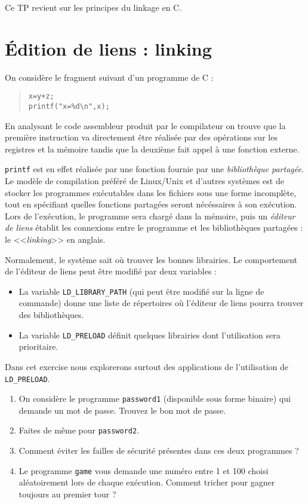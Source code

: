 \documentclass[11pt]{article}
\newcommand{\numtd}{07}
\newcommand{\titretd}{Petit hack entre amis}
\begin{document}
\entete{\numtd}{\titretd}

\begin{introduction}
Ce TP revient sur les principes du linkage en C.
\end{introduction}

\section*{Édition de liens : linking}

On considère le fragment suivant d'un programme de C :
\begin{quote}
\texttt{x=y+z;}\\
\verb+printf("x=%d\n",x);+
\end{quote}

En analysant le code assembleur produit par le compilateur on trouve
que la première instruction va directement être réalisée par
des opérations sur les registres et la mémoire tandis que la deuxième
fait appel à une fonction externe.

\texttt{printf} est en effet réalisée par une fonction fournie par une
\emph{bibliothèque partagée}. Le modèle de compilation préféré
de Linux/Unix et d'autres systèmes est de stocker les programmes exécutables
dans les fichiers sous une forme incomplète, tout en spécifiant quelles
fonctions partagées seront nécéssaires à son exécution. Lors de
l'exécution, le programme sera chargé dans la mémoire, puis un
\emph{éditeur de liens} établit les connexions entre le programme
et les bibliothèques partagées : le <<\emph{linking}>> en anglais.

Normalement, le système sait où trouver les bonnes librairies.
Le comportement de l'éditeur de liens peut être modifié par deux
variables :
\begin{itemize}
\item La variable \texttt{LD\_LIBRARY\_PATH} (qui peut être modifié
  sur la ligne de commande) donne une liste de répertoires où l'éditeur
  de liens pourra trouver des bibliothèques.
\item La variable \texttt{LD\_PRELOAD} définit quelques librairies dont
  l'utilisation sera prioritaire.
\end{itemize}

Dans cet exercise nous explorerons surtout des applications de l'utilisation de
\texttt{LD\_PRELOAD}.

\begin{enumerate}
\item On considère le programme \texttt{password1} (disponible sous forme
  binaire) qui demande un mot de passe. Trouvez le bon mot de passe.
\item Faites de même pour \texttt{password2}.
\item Comment éviter les failles de sécurité présentes dans ces
  deux programmes ?
\item Le programme \texttt{game} vous demande une numéro entre 1 et 100
  choisi aléatoirement lors de chaque exécution. Comment tricher pour
  gagner toujours au premier tour ?
\end{enumerate}
\end{document}
